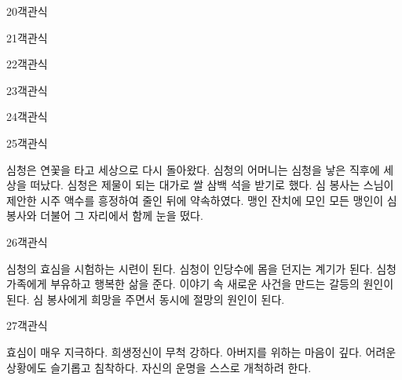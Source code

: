 \documentclass[fs9,seriesRus]{korfarm-base}
\begin{document}
\begin{kfQBlock}{20}{객관식}
\end{kfQBlock}
\begin{kfQBlock}{21}{객관식}
\end{kfQBlock}
\begin{kfQBlock}{22}{객관식}
\end{kfQBlock}
\begin{kfQBlock}{23}{객관식}
\end{kfQBlock}
\begin{kfQBlock}{24}{객관식}
\end{kfQBlock}
\begin{kfQBlock}{25}{객관식}
\begin{kfChoices}
\kfChoice 심청은 연꽃을 타고 세상으로 다시 돌아왔다.
\kfChoice 심청의 어머니는 심청을 낳은 직후에 세상을 떠났다.
\kfChoice 심청은 제물이 되는 대가로 쌀 삼백 석을 받기로 했다.
\kfChoice 심 봉사는 스님이 제안한 시주 액수를 흥정하여 줄인 뒤에 약속하였다.
\kfChoice 맹인 잔치에 모인 모든 맹인이 심 봉사와 더불어 그 자리에서 함께 눈을 떴다.
\end{kfChoices}
\end{kfQBlock}
\begin{kfQBlock}{26}{객관식}
\begin{kfChoices}
\kfChoice 심청의 효심을 시험하는 시련이 된다.
\kfChoice 심청이 인당수에 몸을 던지는 계기가 된다.
\kfChoice 심청 가족에게 부유하고 행복한 삶을 준다.
\kfChoice 이야기 속 새로운 사건을 만드는 갈등의 원인이 된다.
\kfChoice 심 봉사에게 희망을 주면서 동시에 절망의 원인이 된다.
\end{kfChoices}
\end{kfQBlock}
\begin{kfQBlock}{27}{객관식}
\begin{kfChoices}
\kfChoice 효심이 매우 지극하다.
\kfChoice 희생정신이 무척 강하다.
\kfChoice 아버지를 위하는 마음이 깊다.
\kfChoice 어려운 상황에도 슬기롭고 침착하다.
\kfChoice 자신의 운명을 스스로 개척하려 한다.
\end{kfChoices}
\end{kfQBlock}
\end{document}
